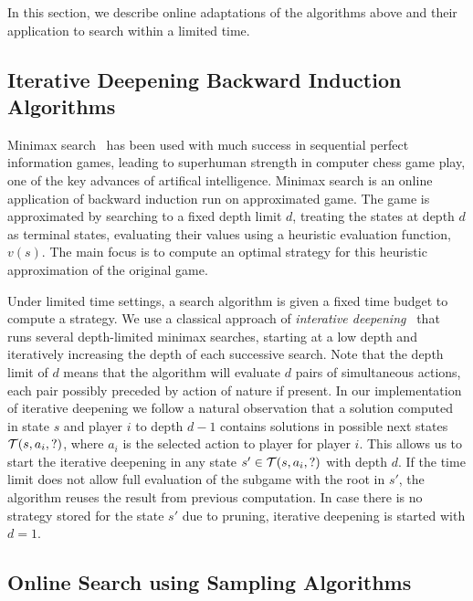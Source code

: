 In this section, we describe online adaptations of the algorithms above and their application 
to search within a limited time. 

\subsection{Iterative Deepening Backward Induction Algorithms} \label{sec:idbi}

Minimax search~\cite{AIbook} has been used with much success in sequential perfect information games, 
leading to superhuman strength in computer chess game play, one of the key advances of artifical 
intelligence. 
Minimax search is an online application of backward induction run on approximated game. 
The game is approximated by searching to a fixed depth limit $d$, treating the states at depth $d$
as terminal states, evaluating their values using a heuristic evaluation function, $v(s)$. 
The main focus is to compute an optimal strategy for this heuristic approximation of the original game. 

Under limited time settings, a search algorithm is given a fixed time budget to compute a strategy. 
We use a classical approach of {\it interative deepening}~\cite{AIbook} that runs several depth-limited 
minimax searches, starting at a low depth and iteratively increasing the depth of each successive search. 
Note that the depth limit of $d$ means that the algorithm will evaluate $d$ pairs of simultaneous actions, each pair possibly preceded by action of nature if present.  
In our implementation of iterative deepening we follow a natural observation that a solution computed in state $s$ and player $i$ to depth $d-1$ contains solutions in possible next states $\mathcal{T}(s,a_i,?)$, where $a_i$ is the selected action to player for player $i$.
This allows us to start the iterative deepening in any state $s' \in \mathcal{T}(s,a_i,?)$ with depth $d$.
If the time limit does not allow full evaluation of the subgame with the root in $s'$, the algorithm reuses the result from previous computation.
In case there is no strategy stored for the state $s'$ due to pruning, iterative deepening is started with $d = 1$.

\subsection{Online Search using Sampling Algorithms}

